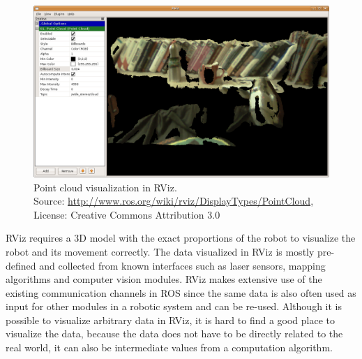 \begin{figure}[htbp]
  \centering
  \includegraphics[scale=0.3]{img/RVizPointCloud.png}
  \caption{Point cloud visualization in RViz.\\Source: \url{http://www.ros.org/wiki/rviz/DisplayTypes/PointCloud}, License: Creative Commons Attribution 3.0}
  \label{rviz_pcl}
\end{figure}




RViz requires a 3D model with the exact proportions of the robot to visualize the robot and its movement correctly. The data visualized in RViz is mostly pre-defined and collected from known interfaces such as laser sensors, mapping algorithms and computer vision modules. RViz makes extensive use of the existing communication channels in ROS since the same data is also often used as input for other modules in a robotic system and can be re-used. Although it is possible to visualize arbitrary data in RViz, it is hard to find a good place to visualize the data, because the data does not have to be directly related to the real world, it can also be intermediate values from a computation algorithm.

